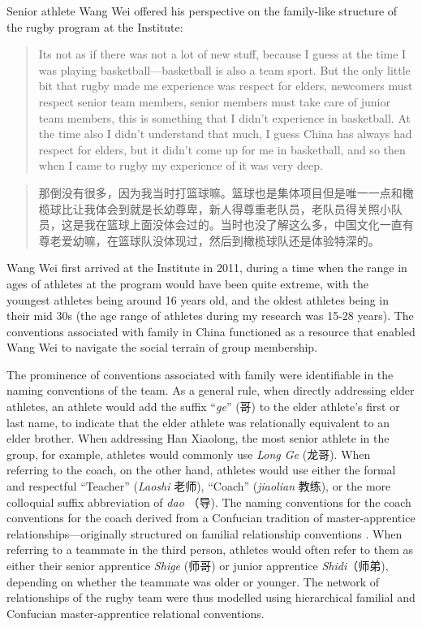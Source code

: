 \begin{CJK}{UTF8}{gbsn}
Senior athlete Wang Wei offered his perspective on the family-like structure of the rugby program at the Institute:

  \begin{quotation}
    Its not as if there was not a lot of new stuff, because I guess at the time I was playing basketball---basketball is also a team sport.  But the only little bit that rugby made me experience was respect for elders, newcomers must respect senior team members, senior members must take care of junior team members, this is something that I didn’t experience in basketball.  At the time also I didn’t understand that much, I guess China has always had respect for elders, but it didn’t come up for me in basketball, and so then when I came to rugby my experience of it was very deep.
  \end{quotation}

  \begin{quotation}
     那倒没有很多，因为我当时打篮球嘛。篮球也是集体项目但是唯一一点和橄榄球比让我体会到就是长幼尊卑，新人得尊重老队员，老队员得关照小队员，这是我在篮球上面没体会过的。当时也没了解这么多，中国文化一直有尊老爱幼嘛，在篮球队没体现过，然后到橄榄球队还是体验特深的。
  \end{quotation}

Wang Wei first arrived at the Institute in 2011, during a time when the range in ages of athletes at the program would have been quite extreme, with the youngest athletes being around 16 years old, and the oldest athletes being in their mid 30s (the age range of athletes during my research was 15-28 years).  The conventions associated with family in China functioned as a resource that enabled Wang Wei to navigate the social terrain of group membership.

The prominence of conventions associated with family were identifiable in the naming conventions of the team.  As a general rule, when directly addressing elder athletes, an athlete would add the suffix ``\textit{ge}'' (哥) to the elder athlete's first or last name, to indicate that the elder athlete was relationally equivalent to an elder brother.  When addressing Han Xiaolong, the most senior athlete in the group, for example, athletes would commonly use \textit{Long Ge} (龙哥).  When referring to the coach, on the other hand, athletes would use either the formal and respectful ``Teacher'' (\textit{Laoshi} 老师), ``Coach'' (\textit{jiaolian} 教练), or the more colloquial suffix abbreviation of \textit{dao} （导). The naming conventions for the coach conventions for the coach derived from a Confucian tradition of master-apprentice relationships---originally structured on familial relationship conventions \citep{Spence1999}. When referring to a teammate in the third person, athletes would often refer to them as either their senior apprentice \textit{Shige} (师哥) or junior apprentice \textit{Shidi}（师弟), depending on whether the teammate was older or younger.  The network of relationships of the rugby team were thus modelled using hierarchical familial and Confucian master-apprentice relational conventions.


\end{CJK}
